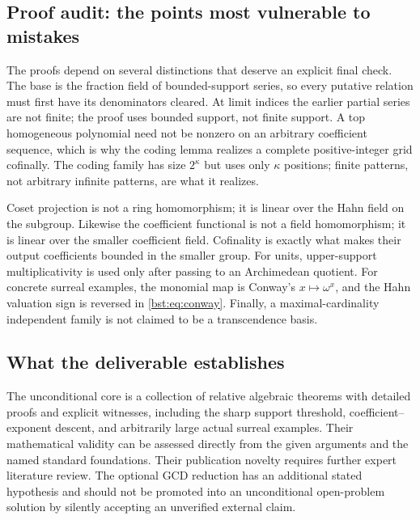 \documentclass[11pt,letterpaper]{article}
\theoremstyle{definition}
\theoremstyle{remark}
\begin{document}
\subsection{Proof audit: the points most vulnerable to mistakes}

The proofs depend on several distinctions that deserve an explicit final
check. The base is the fraction field of bounded-support series, so every
putative relation must first have its denominators cleared. At limit
indices the earlier partial series are not finite; the proof uses bounded
support, not finite support. A top homogeneous polynomial need not be
nonzero on an arbitrary coefficient sequence, which is why the coding
lemma realizes a complete positive-integer grid cofinally. The coding
family has size $2^\kappa$ but uses only $\kappa$ positions; finite patterns,
not arbitrary infinite patterns, are what it realizes.

Coset projection is not a ring homomorphism; it is linear over the Hahn
field on the subgroup. Likewise the coefficient functional is not a field
homomorphism; it is linear over the smaller coefficient field. Cofinality
is exactly what makes their output coefficients bounded in the smaller
group. For units, upper-support multiplicativity is used only after
passing to an Archimedean quotient. For concrete surreal examples, the
monomial map is Conway's $x\mapsto\omega^x$, and the Hahn valuation sign
is reversed in \eqref{bst:eq:conway}. Finally, a maximal-cardinality independent
family is not claimed to be a transcendence basis.

\subsection{What the deliverable establishes}

The unconditional core is a collection of relative algebraic theorems
with detailed proofs and explicit witnesses, including the sharp support
threshold, coefficient--exponent descent, and arbitrarily large actual
surreal examples. Their mathematical validity can be assessed directly
from the given arguments and the named standard foundations. Their
publication novelty requires further expert literature review. The
optional GCD reduction has an additional stated hypothesis and should not
be promoted into an unconditional open-problem solution by silently
accepting an unverified external claim.
\end{document}
